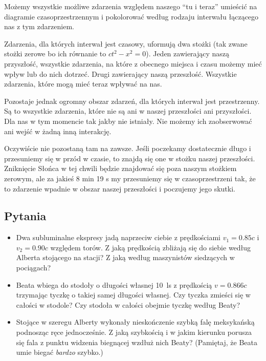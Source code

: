 \documentclass[10pt,twocolumn,fleqn,polish]{article}
\begin{document}
Możemy wszystkie możliwe zdarzenia względem naszego ``tu i teraz'' umieścić na diagramie
czasoprzestrzennym i pokolorować według rodzaju interwału łączącego nas z tym zdarzeniem.

Zdarzenia, dla których interwał jest czasowy, uformują dwa stożki (tak zwane
stożki zerowe bo ich równanie to $ct^2 - x^2 = 0$).
Jeden zawierający naszą przyszłość, wszystkie zdarzenia, na które z
obecnego miejsca i czasu możemy mieć wpływ lub do nich dotrzeć.
Drugi zawierający naszą przeszłość. Wszystkie zdarzenia, które
mogą mieć teraz wpływać na nas.

Pozostaje jednak ogromny obszar zdarzeń, dla których interwał jest przestrzenny.
Są to wszystkie zdarzenia, które nie są ani w naszej przeszłości ani przyszłości.
Dla nas w tym momencie tak jakby nie istniały. Nie możemy ich zaobserwować
ani wejść w żadną inną interakcję.

Oczywiście nie pozostaną tam na zawsze. Jeśli poczekamy dostatecznie długo i
przesuniemy się w przód w czasie, to znajdą się one w stożku naszej przeszłości.
Zniknięcie Słońca w tej chwili będzie znajdować się poza naszym stożkiem zerowym,
ale za jakieś 8 min 19 s my przesuniemy się w czasoprzestrzeni tak, że to zdarzenie wpadnie
w obszar naszej przeszłości i poczujemy jego skutki.
\newpage

\subsection*{Pytania}
\begin{itemize}
  \item Dwa subluminalne ekspresy jadą naprzeciw ciebie z prędkościami $v_1 = 0.85c$
        i $v_2 = 0.90c$ względem torów. Z jaką prędkością zbliżają się do siebie według Alberta
        stojącego na stacji? Z jaką według maszynistów siedzących w pociągach?
  \item Beata wbiega do stodoły o długości własnej \SI{10}{ls} z prędkością $v = 0.866c$
        trzymając tyczkę o takiej samej długości własnej. Czy tyczka zmieści się
        w całości w stodole? Czy stodoła w całości obejmie tyczkę według Beaty?
  \item Stojące w szeregu Alberty wykonały nieskończenie szybką falę meksykańską
        podnosząc ręce jednocześnie. Z jaką szybkością i w jakim kierunku porusza
        się fala z punktu widzenia biegnącej wzdłuż nich Beaty?
        (Pamiętaj, że Beata umie biegać \textit{bardzo} szybko.)
\end{itemize}
\newpage
\end{document}
